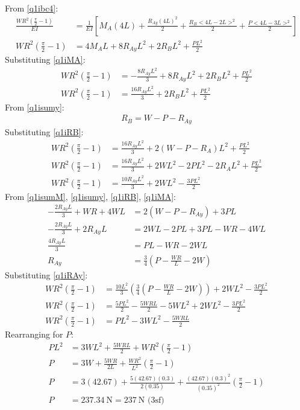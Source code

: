 \documentclass[11pt]{article}
\numberwithin{equation}{section}
\begin{document}
From \ref{q1ibc4}:
\begin{align}
    \frac{WR^2\left(\frac{\pi}{2}-1\right)}{EI} &= \frac{1}{EI} \left[M_A \left(4L\right) + \frac{R_{Ay}\left(4L\right)^2}{2} + \frac{R_B<4L-2L>^2}{2} + \frac{P<4L-3L>^2}{2}\right]\\
    WR^2\left(\frac{\pi}{2}-1\right) &= 4M_A L + 8R_{Ay}L^2 + 2R_BL^2 + \frac{PL^2}{2}
\end{align}
Substituting \ref{q1iMA}:
\begin{align}
    WR^2\left(\frac{\pi}{2}-1\right) &= -\frac{8R_{Ay}L^2}{3} + 8R_{Ay}L^2 + 2R_BL^2 + \frac{PL^2}{2}\\
    WR^2\left(\frac{\pi}{2}-1\right) &= \frac{16R_{Ay}L^2}{3} + 2R_BL^2 + \frac{PL^2}{2}
\end{align}
From \ref{q1isumy}:
\begin{align}
    R_B = W - P - R_{Ay} \label{q1iRB}
\end{align}
Substituting \ref{q1iRB}:
\begin{align}
    WR^2\left(\frac{\pi}{2}-1\right) &= \frac{16R_{Ay}L^2}{3} + 2\left(W - P - R_A\right)L^2 + \frac{PL^2}{2}\\
    WR^2\left(\frac{\pi}{2}-1\right) &= \frac{16R_{Ay}L^2}{3} + 2WL^2 - 2PL^2 - 2R_AL^2 + \frac{PL^2}{2}\\
    WR^2\left(\frac{\pi}{2}-1\right) &= \frac{10R_{Ay}L^2}{3} + 2WL^2 -\frac{3PL^2}{2}
\end{align}
From \ref{q1isumM}, \ref{q1isumy}, \ref{q1iRB}, \ref{q1iMA}: 
\begin{align}
    -\frac{2R_{Ay}L}{3} + WR + 4WL &= 2 \left(W - P - R_{Ay}\right) + 3PL\\
    -\frac{2R_{Ay}L}{3} + 2R_{Ay}L &= 2WL -2PL + 3PL -WR - 4WL\\
    \frac{4R_{Ay}L}{3} &= PL - WR -2WL\\
    R_{Ay} &= \frac{3}{4}\left(P - \frac{WR}{L} - 2W\right) \label{q1iRAy}
\end{align}
Substituting \ref{q1iRAy}:
\begin{align}
    WR^2\left(\frac{\pi}{2}-1\right) &= \frac{10L^2}{3}\left(\frac{3}{4}\left(P - \frac{WR}{L} - 2W\right)\right) + 2WL^2 - \frac{3PL^2}{2}\\
    WR^2\left(\frac{\pi}{2}-1\right) &= \frac{5PL^2}{2} - \frac{5WRL}{2} - 5WL^2 + 2WL^2 - \frac{3PL^2}{2}\\
    WR^2\left(\frac{\pi}{2}-1\right) &= PL^2 - 3WL^2 - \frac{5WRL}{2}
\end{align}
Rearranging for $P$:
\begin{align}
    PL^2 &= 3WL^2 + \frac{5WRL}{2} + WR^2 \left(\frac{\pi}{2}-1\right)\\
    P &= 3W + \frac{5WR}{2L} + \frac{WR^2}{L^2} \left(\frac{\pi}{2}-1\right)\\
    P &= 3(42.67) + \frac{5(42.67)(0.3)}{2(0.35)} + \frac{(42.67)(0.3)^2}{(0.35)^2} \left(\frac{\pi}{2}-1\right)\\
    P &= \SI{237.34}{\newton} = \SI{237}{\newton} \textrm{ (3sf)} \label{eq:q1i2}
\end{align}
\end{document}
